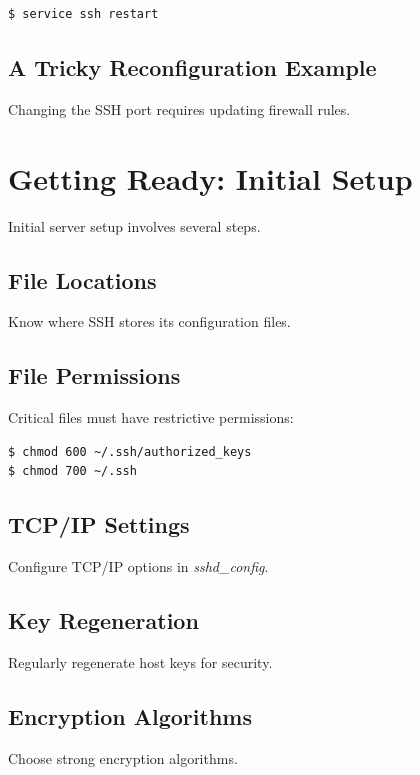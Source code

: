 \documentclass[12pt]{book}
\begin{document}
\begin{lstlisting}[language=bash]
$ service ssh restart
\end{lstlisting}

\subsection{A Tricky Reconfiguration Example}

Changing the SSH port requires updating firewall rules.

\section{Getting Ready: Initial Setup}

Initial server setup involves several steps.

\subsection{File Locations}

Know where SSH stores its configuration files.

\subsection{File Permissions}

Critical files must have restrictive permissions:
\begin{lstlisting}[language=bash]
$ chmod 600 ~/.ssh/authorized_keys
$ chmod 700 ~/.ssh
\end{lstlisting}

\subsection{TCP/IP Settings}

Configure TCP/IP options in \textit{sshd\_config}.

\subsection{Key Regeneration}

Regularly regenerate host keys for security.

\subsection{Encryption Algorithms}

Choose strong encryption algorithms.
\end{document}
